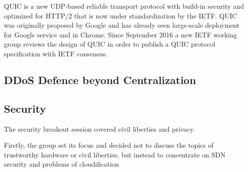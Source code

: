 QUIC is a new UDP-based reliable transport protocol with build-in security and optimized for HTTP/2 that is now under standardization by the IETF. QUIC was originally proposed by Google and has already seen large-scale deployment for Google service and in Chrome. Since September 2016 a new IETF working group reviews the design of QUIC in order to publish a QUIC protocol specification with IETF consensus.




\subsection{DDoS Defence beyond Centralization}

\subsection{Security}

The security breakout session covered civil liberties and privacy.

Firstly, the group set its focus and decided not to discuss the topics of trustworthy hardware or civil liberties, but instead to concentrate on SDN security and problems of cloudification

